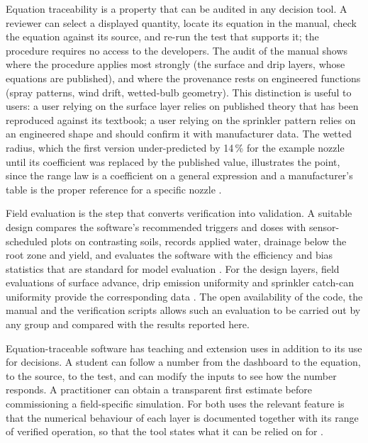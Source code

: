 Equation traceability is a property that can be audited in any decision tool. A reviewer can select a displayed quantity, locate its equation in the manual, check the equation against its source, and re-run the test that supports it; the procedure requires no access to the developers. The audit of the manual shows where the procedure applies most strongly (the surface and drip layers, whose equations are published), and where the provenance rests on engineered functions (spray patterns, wind drift, wetted-bulb geometry). This distinction is useful to users: a user relying on the surface layer relies on published theory that has been reproduced against its textbook; a user relying on the sprinkler pattern relies on an engineered shape and should confirm it with manufacturer data. The wetted radius, which the first version under-predicted by 14\,\% for the example nozzle until its coefficient was replaced by the published value, illustrates the point, since the range law is a coefficient on a general expression and a manufacturer's table is the proper reference for a specific nozzle \citep{Keller1990,Playan2005}.


Field evaluation is the step that converts verification into validation. A suitable design compares the software's recommended triggers and doses with sensor-scheduled plots on contrasting soils, records applied water, drainage below the root zone and yield, and evaluates the software with the efficiency and bias statistics that are standard for model evaluation \citep{Moriasi2007,Nash1970,Bennett2013}. For the design layers, field evaluations of surface advance, drip emission uniformity and sprinkler catch-can uniformity provide the corresponding data \citep{Walker1987,Burt1997,Playan2005}. The open availability of the code, the manual and the verification scripts allows such an evaluation to be carried out by any group and compared with the results reported here.

Equation-traceable software has teaching and extension uses in addition to its use for decisions. A student can follow a number from the dashboard to the equation, to the source, to the test, and can modify the inputs to see how the number responds. A practitioner can obtain a transparent first estimate before commissioning a field-specific simulation. For both uses the relevant feature is that the numerical behaviour of each layer is documented together with its range of verified operation, so that the tool states what it can be relied on for \citep{Wilkinson2016,Hutton2016}.

